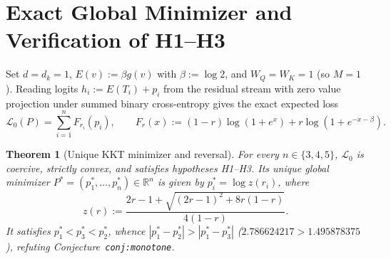 \documentclass[11pt]{article}
\theoremstyle{plain}
\newtheorem{theorem}{Theorem}
\theoremstyle{definition}
\theoremstyle{remark}
\begin{document}
\section{Exact Global Minimizer and Verification of H1--H3}

Set $d = d_k = 1$, $E(v) := \beta g(v)$ with $\beta := \log 2$, and $W_Q = W_K = 1$ (so $M = 1$). Reading logits $h_i := E(T_i) + p_i$ from the residual stream with zero value projection under summed binary cross-entropy gives the exact expected loss
\begin{equation}\label{eq:L0}
\mathcal{L}_0(P) = \sum_{i=1}^n F_{r_i}(p_i),
\qquad
F_r(x) := (1 - r)\log(1 + e^x) + r\log(1 + e^{-x-\beta}).
\end{equation}

\begin{theorem}[Unique KKT minimizer and reversal]\label{thm:main}
For every $n \in \{3, 4, 5\}$, $\mathcal{L}_0$ is coercive, strictly convex, and satisfies hypotheses \textup{H1--H3}. Its unique global minimizer $P^* = (p_1^*, \dots, p_n^*) \in \mathbb{R}^n$ is given by $p_i^* = \log z(r_i)$, where
\[
z(r) := \frac{2r - 1 + \sqrt{(2r - 1)^2 + 8r(1 - r)}}{4(1 - r)}.
\]
It satisfies $p_1^* < p_3^* < p_2^*$, whence $|p_1^* - p_2^*| > |p_1^* - p_3^*|$ ($2.786624217 > 1.495878375$), refuting Conjecture~\texttt{conj:monotone}.
\end{theorem}
\end{document}
